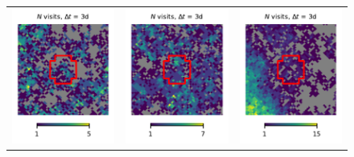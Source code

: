 \documentclass[preprintm,linenumbers]{aastex631}
\begin{document}
\begin{figure}
\begin{tabular}{  c c c}
				\includegraphics{results/skymaps_cutout/skymaps_cutout_first_year_one_snap_v4_0_10yrs_db_noDD_noTwi_tscale-3_nside-256_doAllTemplateMetrics_reduceCount_g_NES_noDD_noTwi.pdf} &
				\includegraphics{results/skymaps_cutout/skymaps_cutout_first_year_one_snap_v4_0_10yrs_db_noDD_noTwi_tscale-3_nside-256_doAllTemplateMetrics_reduceCount_g_WFD_noDD_noTwi.pdf} &
				\includegraphics{results/skymaps_cutout/skymaps_cutout_first_year_one_snap_v4_0_10yrs_db_noDD_noTwi_tscale-3_nside-256_doAllTemplateMetrics_reduceCount_g_GP_noDD_noTwi.pdf} \\

\end{tabular}
\end{figure}
\end{document}
